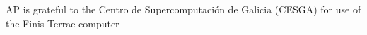 \documentclass[aps,prl,superscriptaddress,twocolumn]{revtex4}
\begin{document}
\begin{acknowledgments}
AP is grateful to the Centro de
Supercomputación de Galicia (CESGA) for use of the Finis
Terrae computer
\end{acknowledgments}





\listoftodos
\end{document}
